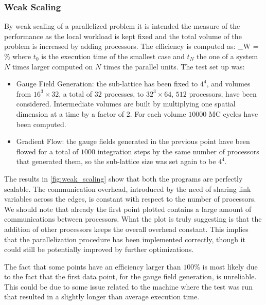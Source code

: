 \subsubsection{Weak Scaling}
By weak scaling of a parallelized problem it is intended the measure of the performance as the local workload is kept fixed and the total volume of the problem is increased by adding processors. The efficiency is computed as:
\beq
\eta_W = \% 
\label{eq:eta_weak}
\eeq 
where $t_0$ is the execution time of the smallest case and $t_N$ the one of a system $N$ times larger computed on $N$ times the parallel units. The test set up was:
\begin{itemize}
    \item Gauge Field Generation: the sub-lattice has been fixed to $4^4$, and volumes from $16^3\times32$, a total of $32$ processes, to $32^3\times64$, $512$ processors, have been considered. Intermediate volumes are built by multiplying one spatial dimension at a time by a factor of 2. For each volume $10000$ MC cycles have been computed.
    \item Gradient Flow: the gauge fields generated in the previous point have been flowed for a total of $1000$ integration steps by the same number of processors that generated them, so the sub-lattice size was set again to be $4^4$.
\end{itemize}


The results in \cref{fig:weak_scaling} show that both the programs are perfectly scalable. The communication overhead, introduced by the need of sharing link variables across the edges, is constant with respect to the number of processors. We should note that already the first point plotted contains a large amount of communications between processors. What the plot is truly suggesting is that the addition of other processors keeps the overall overhead constant. This implies that the parallelization procedure has been implemented correctly, though it could still be potentially improved by further optimizations.

The fact that some points have an efficiency larger than $100\%$ is most likely due to the fact that the first data point, for the gauge field generation, is unreliable. This could be due to some issue related to the machine where the test was run that resulted in a slightly longer than average execution time. \\

